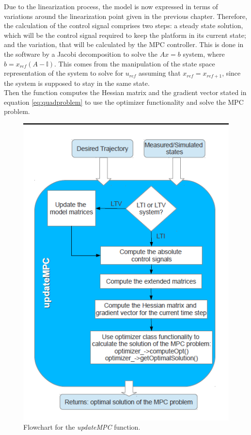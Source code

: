 \begin{itemize}
Due to the linearization process, the model is now expressed in terms of variations around the linearization point given in the previous chapter. Therefore, the calculation of the control signal comprises two steps: a steady state solution, which will be the control signal required to keep the platform in its current state; and the variation, that will be calculated by the MPC controller. This is done in the software by a Jacobi decomposition to solve the $Ax = b$ system, where $b = x_{ref}(A - \mathbb{I})$. This comes from the manipulation of the state space representation of the system to solve for $u_{ref}$ assuming that $x_{ref} = x_{ref + 1}$, since the system is supposed to stay in the same state.\\

Then the function computes the Hessian matrix and the gradient vector stated in equation \ref{eq:quadproblem} to use the optimizer functionality and solve the MPC problem. 

\begin{figure}[H]
\centering
\includegraphics[scale=0.8]{Images/Chapter4/updateMPCflowchart.png}
\caption{Flowchart for the \emph{updateMPC} function.}
\label{fig:updateMPC_flowchart}
\end{figure}
\end{itemize}

